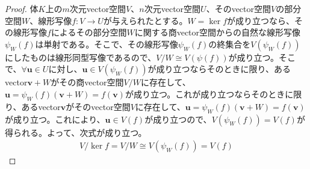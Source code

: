 \documentclass[dvipdfmx]{jsarticle}
\begin{document}
\begin{proof}
体$K$上の$m$次元vector空間$V$、$n$次元vector空間$U$、そのvector空間$V$の部分空間$W$、線形写像$f:V \rightarrow U$が与えられたとする。$W = \ker f$が成り立つなら、その線形写像$f$によるその部分空間$W$に関する商vector空間からの自然な線形写像$\psi_{W}(f)$は単射である。そこで、その線形写像$\psi_{W}(f)$の終集合を$V\left( \psi_{W}(f) \right)$にしたものは線形同型写像であるので、${V}/{W} \cong V\left( \psi(f) \right)$が成り立つ。そこで、$\forall\mathbf{u} \in U$に対し、$\mathbf{u} \in V\left( \psi_{W}(f) \right)$が成り立つならそのときに限り、あるvector$\mathbf{v} + W$がその商vector空間${V}/{W}$に存在して、$\mathbf{u} = \psi_{W}(f)\left( \mathbf{v} + W \right) = f\left( \mathbf{v} \right)$が成り立つ。これが成り立つならそのときに限り、あるvector$\mathbf{v}$がそのvector空間$V$に存在して、$\mathbf{u} = \psi_{W}(f)\left( \mathbf{v} + W \right) = f\left( \mathbf{v} \right)$が成り立つ。これにより、$\mathbf{u} \in V(f)$が成り立つので、$V\left( \psi_{W}(f) \right) = V(f)$が得られる。よって、次式が成り立つ。
\begin{align*}
{V}/{\ker f} = {V}/{W} \cong V\left( \psi_{W}(f) \right) = V(f)
\end{align*}
\end{proof}
\end{document}
